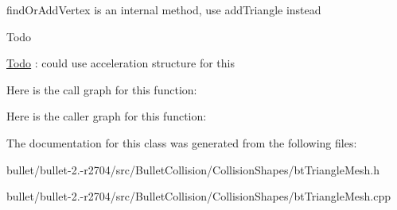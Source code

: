 find\+Or\+Add\+Vertex is an internal method, use add\+Triangle instead 

\begin{DoxyRefDesc}{Todo}
\item[\hyperlink{todo__todo000034}{Todo}]\+: could use acceleration structure for this \end{DoxyRefDesc}


Here is the call graph for this function\+:




Here is the caller graph for this function\+:




The documentation for this class was generated from the following files\+:\begin{DoxyCompactItemize}
\item 
bullet/bullet-\/2.-\/r2704/src/\+Bullet\+Collision/\+Collision\+Shapes/bt\+Triangle\+Mesh.\+h\item 
bullet/bullet-\/2.-\/r2704/src/\+Bullet\+Collision/\+Collision\+Shapes/bt\+Triangle\+Mesh.\+cpp\end{DoxyCompactItemize}
